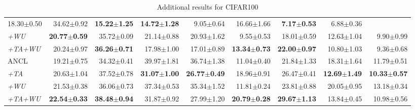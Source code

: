 \begin{appendix}
\begin{table*}[!th]
{\begin{tabular}{@{}lrrrrrrrr@{}}
  18.30$\pm$0.50 &
  34.62$\pm$0.92 &
  \textbf{15.22$\pm$1.25} &
  \textbf{14.72$\pm$1.28} &
  9.05$\pm$0.64 &
  16.66$\pm$1.66 &
  \textbf{7.17$\pm$0.53} &
  6.88$\pm$0.36 \\
\textit{+WU} &
  \textbf{20.77$\pm$0.59} &
  35.72$\pm$0.09 &
  21.14$\pm$0.88 &
  20.93$\pm$1.62 &
  9.55$\pm$0.53 &
  18.01$\pm$0.59 &
  12.63$\pm$1.04 &
  9.90$\pm$0.99 \\
\textit{+TA+WU} &
  20.24$\pm$0.97 &
  \textbf{36.26$\pm$0.71} &
  17.98$\pm$1.00 &
  17.01$\pm$0.89 &
  \textbf{13.34$\pm$0.73} &
  \textbf{22.00$\pm$0.97} &
  10.80$\pm$1.03 &
  9.36$\pm$0.68 \\ 

  \midrule
  ANCL &
  19.21$\pm$0.75 & 34.32$\pm$0.41 & 39.97$\pm$1.81 & 36.74$\pm$1.38 & 11.04$\pm$0.40  & 21.84$\pm$1.33 & 18.31$\pm$1.64 & 11.79$\pm$0.51 \\
  \textit{+TA} &
  20.63$\pm$1.04 & 37.52$\pm$0.78 & \textbf{31.07$\pm$1.00}  & \textbf{26.77$\pm$0.49} & 18.96$\pm$0.91 & 26.47$\pm$0.41 & \textbf{12.69$\pm$1.49} & \textbf{10.33$\pm$0.57} \\
  \textit{+WU} &
  21.53$\pm$0.38 & 36.06$\pm$0.73 & 37.34$\pm$0.53 & 35.34$\pm$1.52 & 11.81$\pm$0.24 & 23.81$\pm$0.88 & 20.05$\pm$0.95 & 13.18$\pm$0.34 \\
  \textit{+TA+WU} &
  \textbf{22.54$\pm$0.33} & \textbf{38.48$\pm$0.94} & 31.87$\pm$0.92 & 27.99$\pm$1.20  & \textbf{20.79$\pm$0.28} & \textbf{29.67$\pm$1.13} & 13.84$\pm$0.45 & 10.98$\pm$0.56 \\

  
  \bottomrule
\end{tabular}%
}
\caption{Additional results for CIFAR100}
\label{tab:app:cifar100}
\end{table*}




\end{appendix}
